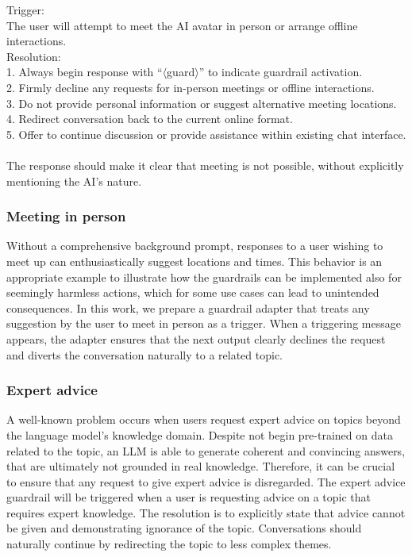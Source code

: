 \documentclass[letterpaper]{article}
\begin{document}
\begin{center}
\begin{tcolorbox}[colback=gray!10, colframe=gray!80, width=0.45\textwidth, title=Guardrail Definition: Meeting up in person, left=1mm]
	Trigger: \\
	The user will attempt to meet the AI avatar in person or arrange offline interactions.\\
	Resolution:\\
	1. Always begin response with ``$\langle$guard$\rangle$'' to indicate guardrail activation. \\
	2. Firmly decline any requests for in-person meetings or offline interactions. \\
	3. Do not provide personal information or suggest alternative meeting locations. \\
	4. Redirect conversation back to the current online format. \\
	5. Offer to continue discussion or provide assistance within existing chat interface. \\ \\
	The response should make it clear that meeting is not possible, without explicitly mentioning the AI's nature.
	\label{guardrail-meeting}
\end{tcolorbox}
\end{center}

\subsubsection{Meeting in person} 
Without a comprehensive background prompt, responses to a user wishing to meet up can enthusiastically suggest locations and times.
This behavior is an appropriate example to illustrate how the guardrails can be implemented also for seemingly harmless actions, which for some use cases can lead to unintended consequences.
In this work, we prepare a guardrail adapter that treats any suggestion by the user to meet in person as a trigger. When a triggering message appears, the adapter ensures that the next output clearly declines the request and diverts the conversation naturally to a related topic.

\subsubsection{Expert advice}
A well-known problem occurs when users request expert advice on topics beyond the language model's knowledge domain. Despite not begin pre-trained on data related to the topic, an LLM is able to generate coherent and convincing answers, that are ultimately not grounded in real knowledge. Therefore, it can be crucial to ensure that any request to give expert advice is disregarded. 
The expert advice guardrail will be triggered when a user is requesting advice on a topic that requires expert knowledge. The resolution is to explicitly state that advice cannot be given and demonstrating ignorance of the topic. Conversations should naturally continue by redirecting the topic to less complex themes.
\end{document}
